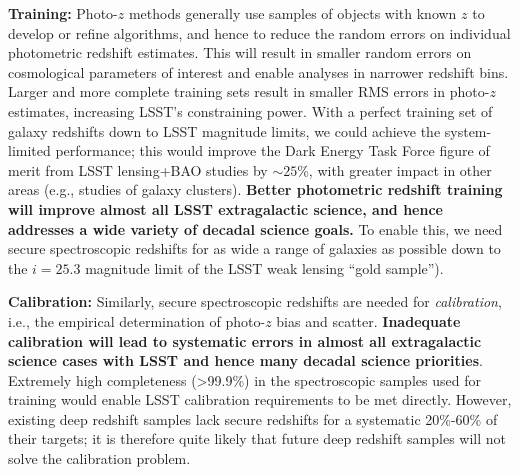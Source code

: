 
{\bf Training:} Photo-$z$ methods generally use samples of objects with known $z$ to develop or
refine algorithms, and hence to reduce the random errors on individual photometric redshift
estimates. This will result in smaller random errors on cosmological parameters of interest and
enable analyses in narrower redshift bins.  Larger and more complete training sets result in smaller
RMS errors in photo-$z$ estimates, increasing LSST's constraining power.
With a perfect training set of galaxy redshifts down to LSST magnitude limits, we could achieve the system-limited performance; this would improve the Dark Energy Task Force figure of merit from LSST lensing+BAO studies by $\sim25$\%, with greater impact in other areas (e.g., studies of galaxy clusters).  {\bf Better photometric redshift training will improve almost all LSST extragalactic science, and hence addresses a wide variety of decadal science goals.}  To enable this, we need secure spectroscopic redshifts for as wide a range of galaxies as possible down to the $i=25.3$ magnitude limit of the LSST weak lensing ``gold sample'').


{\bf Calibration:} Similarly, secure spectroscopic redshifts are needed for {\em calibration}, i.e., the
empirical determination of photo-$z$ bias and scatter.  {\bf Inadequate calibration will lead to
  systematic errors in almost all extragalactic science cases with LSST and hence many decadal science priorities}.
Extremely high completeness (>99.9\%) in the spectroscopic samples used for training would enable
LSST calibration requirements to be met directly. However, existing deep redshift samples lack secure redshifts for a systematic 20\%-60\% of their targets; it is therefore quite likely that future deep redshift samples will not solve the calibration problem.

